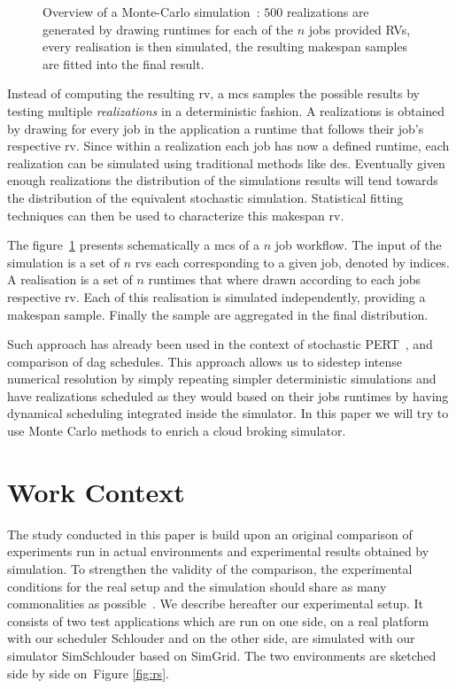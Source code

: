 \documentclass[10pt,conference,compsocconf]{IEEEtran}
\begin{document}
\begin{figure}
	\centering
	\resizebox{0.5\textwidth}{!}{%
		
		}
\caption{Overview of a Monte-Carlo simulation~: $500$ realizations are generated
by drawing runtimes for each of the $n$ jobs provided RVs, every realisation is
then simulated, the resulting makespan samples are fitted into the final
result.}\label{fig:mc-process}
\end{figure}

Instead of computing the resulting \ac{rv}, a \ac{mcs} samples the possible
results by testing multiple \emph{realizations} in a deterministic fashion.
A realizations is obtained by drawing for every job in the application a
runtime that follows their job's respective \ac{rv}. Since within a realization
each job has now a defined runtime, each realization can be simulated using
traditional methods like \ac{des}.  Eventually given enough realizations the
distribution of the simulations results will tend towards the distribution of
the equivalent stochastic simulation.  Statistical fitting techniques can then
be used to characterize this makespan \ac{rv}.

The figure~\ref{fig:mc-process} presents schematically a \ac{mcs} of a $n$ job
workflow. The input of the simulation is a set of $n$ \acp{rv} each
corresponding to a given job, denoted by indices. A realisation is
a set of $n$ runtimes that where drawn according to each jobs respective
\ac{rv}. Each of this realisation is simulated independently,
providing a makespan sample. Finally the sample are aggregated in the final
distribution.

Such approach has already been used in the context of stochastic
PERT~\cite{Slyke63}, and comparison of \ac{dag} schedules\cite{Canon10,Zheng13}.
This approach allows us to sidestep intense numerical resolution by simply
repeating simpler deterministic simulations and have realizations scheduled as
they would based on their jobs runtimes by having dynamical scheduling
integrated inside the simulator. In this paper we will try to use Monte Carlo
methods to enrich a cloud broking simulator.


\section{Work Context}
\label{sec:work-context}

The  study conducted  in this  paper  is build  upon an  original comparison  of
experiments  run in  actual environments  and experimental  results obtained  by
simulation.   To strengthen  the validity  of the  comparison, the  experimental
conditions  for  the  real  setup  and  the  simulation  should  share  as  many
commonalities  as   possible~\cite{PucherGWK15}.   We  describe   hereafter  our
experimental setup.  It consists of two  test applications which are  run on one
side, on a real platform with our scheduler Schlouder and on the other side, are
simulated  with   our  simulator  SimSchlouder   based  on  SimGrid.    The  two
environments are sketched side by side on~Figure \ref{fig:rs}.
\end{document}
